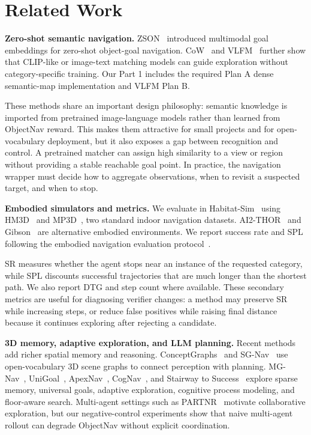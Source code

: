 \documentclass[10pt,twocolumn,letterpaper]{article}
\begin{document}
\section{Related Work}
\textbf{Zero-shot semantic navigation.} ZSON~\cite{zson2022} introduced multimodal goal embeddings for zero-shot object-goal navigation. CoW~\cite{cow2023} and VLFM~\cite{vlfm2024} further show that CLIP-like or image-text matching models can guide exploration without category-specific training. Our Part 1 includes the required Plan A dense semantic-map implementation and VLFM Plan B.

These methods share an important design philosophy: semantic knowledge is imported from pretrained image-language models rather than learned from ObjectNav reward. This makes them attractive for small projects and for open-vocabulary deployment, but it also exposes a gap between recognition and control. A pretrained matcher can assign high similarity to a view or region without providing a stable reachable goal point. In practice, the navigation wrapper must decide how to aggregate observations, when to revisit a suspected target, and when to stop.

\textbf{Embodied simulators and metrics.} We evaluate in Habitat-Sim~\cite{habitat2019} using HM3D~\cite{hm3d2021} and MP3D~\cite{matterport2017}, two standard indoor navigation datasets. AI2-THOR~\cite{ai2thor2017} and Gibson~\cite{gibson2018} are alternative embodied environments. We report success rate and SPL following the embodied navigation evaluation protocol~\cite{spl2018}.

SR measures whether the agent stops near an instance of the requested category, while SPL discounts successful trajectories that are much longer than the shortest path. We also report DTG and step count where available. These secondary metrics are useful for diagnosing verifier changes: a method may preserve SR while increasing steps, or reduce false positives while raising final distance because it continues exploring after rejecting a candidate.

\textbf{3D memory, adaptive exploration, and LLM planning.} Recent methods add richer spatial memory and reasoning. ConceptGraphs~\cite{conceptgraphs2024} and SG-Nav~\cite{sgnav2024} use open-vocabulary 3D scene graphs to connect perception with planning. MG-Nav~\cite{mgnav2025}, UniGoal~\cite{unigoal2025}, ApexNav~\cite{apexnav2025}, CogNav~\cite{cognav2025}, and Stairway to Success~\cite{stairway2026} explore sparse memory, universal goals, adaptive exploration, cognitive process modeling, and floor-aware search. Multi-agent settings such as PARTNR~\cite{partnr2024} motivate collaborative exploration, but our negative-control experiments show that naive multi-agent rollout can degrade ObjectNav without explicit coordination.
\end{document}
